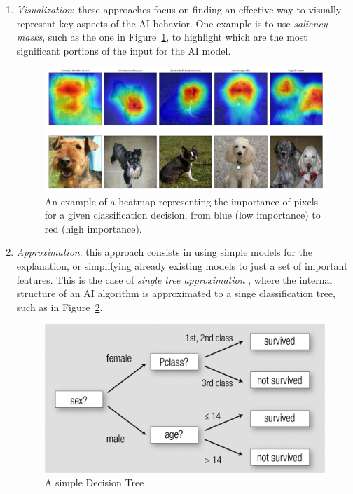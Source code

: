 \documentclass[conference]{IEEEtran}
\newcommand{\cit}[1][]{\todo[tickmarkheight=0.2cm]{cit #1}}
\begin{document}
\begin{enumerate}
    \item \textit{Visualization}: these approaches focus on finding an effective
          way to visually represent key aspects of the AI
          behavior. One example is to use \textit{saliency masks}, such as the
          one in Figure~\ref{fig:heatmap}, to highlight which are the most
          significant portions of the input for the AI model.

          \begin{figure}[h!] \centering \includegraphics[width=0.9\linewidth]{images/dog_localization.png}
              \caption{An example of a heatmap representing the importance of pixels for a given classification decision, from blue (low importance) to red (high importance). } \label{fig:heatmap} \end{figure}

    \item \textit{Approximation}: this approach consists in using simple models for the explanation, or simplifying already existing models to just a set of important features. This is the case of \textit{single tree approximation} \cit, where the internal structure of an AI algorithm is approximated to a singe classification tree, such as in Figure~\ref{fig:dectree}.

          \begin{figure}[ht!] \centering
              \includegraphics[width=0.9\linewidth]{images/dectree} \caption{A simple Decision Tree} \label{fig:dectree} \end{figure}


\end{enumerate}
\end{document}
